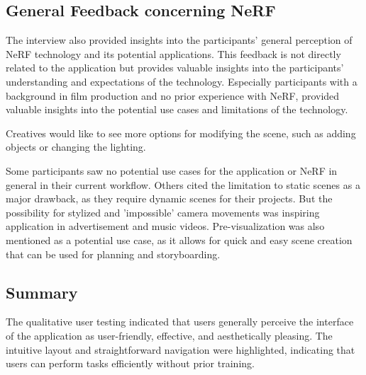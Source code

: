 \subsection*{General Feedback concerning NeRF}

The interview also provided insights into the participants' general perception of NeRF technology and its potential applications.
This feedback is not directly related to the application but provides valuable insights into the participants' understanding and expectations of the technology.
Especially participants with a background in film production and no prior experience with NeRF, provided valuable insights into the potential use cases and limitations of the technology.

Creatives would like to see more options for modifying the scene, such as adding objects or changing the lighting.
\cite{P3}

Some participants saw no potential use cases for the application or NeRF in general in their current workflow. 
\cite{P3}
Others cited the limitation to static scenes as a major drawback, as they require dynamic scenes for their projects. 
\cite{P4, P5}
But the possibility for stylized and 'impossible' camera movements was inspiring application in advertisement and music videos. 
\cite{P4}
Pre-visualization was also mentioned as a potential use case, as it allows for quick and easy scene creation that can be used for planning and storyboarding. 
\cite{P4}


\subsection*{Summary}
\label{sec:result:qualitative_summary}

The qualitative user testing indicated that users generally perceive the interface of the application as user-friendly, effective, and aesthetically pleasing.
The intuitive layout and straightforward navigation were highlighted, indicating that users can perform tasks efficiently without prior training.


